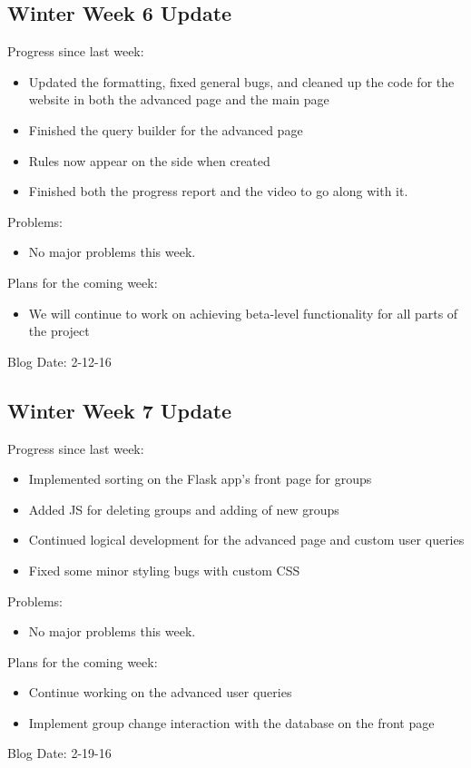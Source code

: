 \subsection{Winter Week 6 Update}
Progress since last week:
\begin{itemize}
   \item Updated the formatting, fixed general bugs, and cleaned up the code for the website in both the advanced page and the main page
   \item Finished the query builder for the advanced page
   \item Rules now appear on the side when created
   \item Finished both the progress report and the video to go along with it.
\end{itemize}
Problems:
\begin{itemize}
   \item No major problems this week.
\end{itemize}
Plans for the coming week:
\begin{itemize}
   \item We will continue to work on achieving beta-level functionality for all parts of the project
\end{itemize}
Blog Date: 2-12-16

\subsection{Winter Week 7 Update}
Progress since last week:
\begin{itemize}
   \item Implemented sorting on the Flask app's front page for groups
   \item Added JS for deleting groups and adding of new groups
   \item Continued logical development for the advanced page and custom user queries
   \item Fixed some minor styling bugs with custom CSS
\end{itemize}
Problems:
\begin{itemize}
   \item No major problems this week.
\end{itemize}
Plans for the coming week:
\begin{itemize}
   \item Continue working on the advanced user queries
   \item Implement group change interaction with the database on the front page
\end{itemize}
Blog Date: 2-19-16

